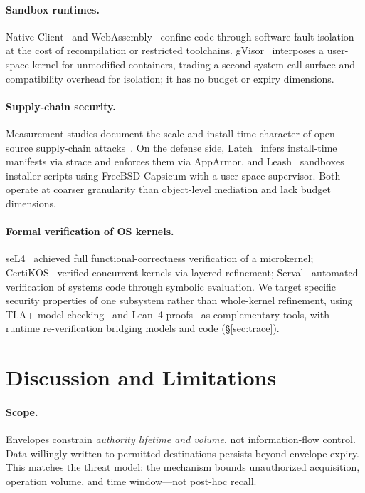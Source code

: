 \documentclass[letterpaper,twocolumn,10pt]{article}
\begin{document}
\paragraph{Sandbox runtimes.}
Native Client~\cite{yee2009nacl} and WebAssembly~\cite{haas2017wasm}
confine code through software fault isolation at the cost of
recompilation or restricted toolchains.  gVisor~\cite{gvisor2019}
interposes a user-space kernel for unmodified containers, trading a
second system-call surface and compatibility overhead for isolation;
it has no budget or expiry dimensions.

\paragraph{Supply-chain security.}
Measurement studies document the scale and install-time character of
open-source supply-chain attacks~\cite{ohm2020backstabber,duan2021measuring,zimmermann2019smallworld,ladisa2023taxonomy}.
On the defense side, Latch~\cite{latch2022} infers install-time
manifests via strace and enforces them via AppArmor, and
Leash~\cite{leash2025} sandboxes installer scripts using FreeBSD
Capsicum with a user-space supervisor.  Both operate at coarser
granularity than object-level mediation and lack budget dimensions.

\paragraph{Formal verification of OS kernels.}
seL4~\cite{klein2009sel4} achieved full functional-correctness
verification of a microkernel; CertiKOS~\cite{gu2016certikos} verified
concurrent kernels via layered refinement; Serval~\cite{nelson2019serval}
automated verification of systems code through symbolic evaluation.  We
target specific security properties of one subsystem rather than
whole-kernel refinement, using TLA+ model
checking~\cite{lamport2002specifying} and Lean~4
proofs~\cite{demoura2021lean4} as complementary tools, with runtime
re-verification bridging models and code (\S\ref{sec:trace}).

\section{Discussion and Limitations}
\label{sec:discussion}

\paragraph{Scope.}
Envelopes constrain \emph{authority lifetime and volume}, not
information-flow control.  Data willingly written to permitted
destinations persists beyond envelope expiry.  This matches the threat
model: the mechanism bounds unauthorized acquisition, operation
volume, and time window---not post-hoc recall.
\end{document}
